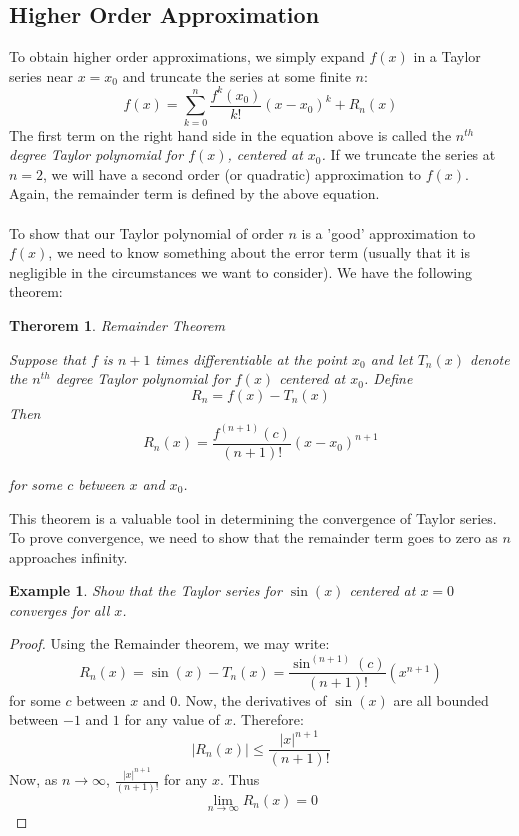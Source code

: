 \documentclass[12pt,a4paper]{article} %
\newtheorem{example}{Example}
\newtheorem{thm}{Therorem}
\begin{document}
\subsection{Higher Order Approximation}
To obtain higher order approximations, we simply expand $f(x)$ in a Taylor series near $x=x_0$ and truncate the series at some finite $n$:
\begin{equation}
f(x) = \sum_{k=0}^n \frac{f^k(x_0)}{k!}(x-x_0)^k + R_n(x)
\end{equation}
The first term on the right hand side in the equation above is called the \emph{$n^{th}$ degree Taylor polynomial for $f(x)$, centered at $x_0$.} If we truncate the series at $n=2$, we will have a second order (or quadratic) approximation to $f(x)$.  Again, the remainder term is defined by the above equation.\\ \\
To show that our Taylor polynomial of order $n$ is a 'good' approximation to $f(x)$, we need to know something about the error term (usually that it is negligible in the circumstances we want to consider).  We have the following theorem:
\begin{thm}{Remainder Theorem}

Suppose that $f$ is $n+1$ times differentiable at the point $x_0$ and let $T_n(x)$ denote the $n^{th}$ degree Taylor polynomial for $f(x)$ centered at $x_0$.  Define 
\begin{equation}
R_n  = f(x) - T_n(x)
\end{equation}
Then
\begin{equation}
R_n(x) = \frac{f^{(n+1)}(c)}{(n+1)!}(x-x_0)^{n+1}
\end{equation}

for some $c$ between $x$ and $x_0$.
\end{thm}
This theorem is a valuable tool in determining the convergence of Taylor series.  To prove convergence, we need to show that the remainder term goes to zero as $n$ approaches infinity.  
\begin{example}
Show that the Taylor series for $\sin(x)$ centered at $x=0$ converges for all $x$.
\end{example}
\begin{proof}
Using the Remainder theorem, we may write:
\begin{equation}
R_n(x) = \sin(x) - T_n(x) = \frac{\sin^{(n+1)}(c)}{(n+1)!}(x^{n+1})
\end{equation}
for some $c$ between $x$ and $0$.  Now, the derivatives of $\sin(x)$ are all bounded between $-1$ and $1$ for any value of $x$.  Therefore:
\begin{equation}
|R_n(x)| \leq \frac{|x|^{n+1}}{(n+1)!} 
\end{equation}
Now, as $n\rightarrow\infty$, $\frac{|x|^{n+1}}{(n+1)!}$ for any $x$.  Thus 
\begin{equation}
\lim_{n\rightarrow\infty} R_n(x) = 0
\end{equation}
\end{proof}
\end{document}
